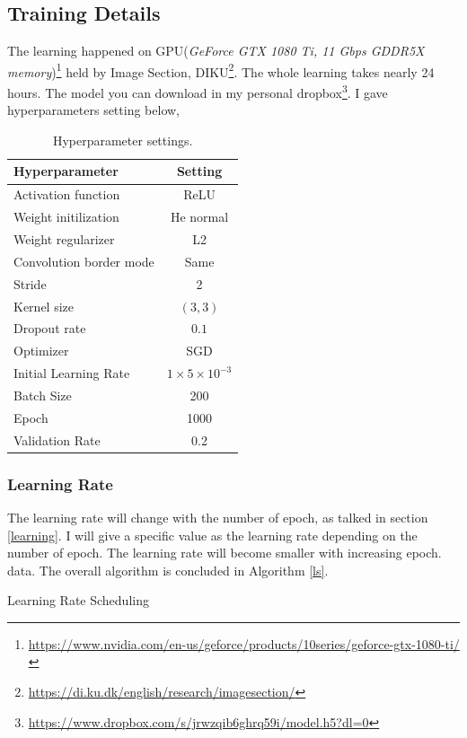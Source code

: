\subsection{Training Details}
    The learning happened on GPU(\textit{GeForce GTX 1080 Ti, 11 Gbps GDDR5X memory})\footnote{\url{https://www.nvidia.com/en-us/geforce/products/10series/geforce-gtx-1080-ti/}} held by Image Section, DIKU\footnote{\url{https://di.ku.dk/english/research/imagesection/}}. The whole learning takes nearly 24 hours. The model you can download in my personal dropbox\footnote{\url{https://www.dropbox.com/s/jrwzqib6ghrq59i/model.h5?dl=0}}. I gave hyperparameters setting below,
    \begin{table}[h!]
        \centering
        \begin{tabular}{ l | c  }
            Hyperparameter  & Setting \\ \hline
            Activation function & ReLU \\
            Weight initilization & He normal\cite{sutskever2013importance} \\
            Weight regularizer &  L2 \cite{hinton2006fast} \\
            Convolution border mode   & Same \\
            Stride & 2 \\ 
            Kernel size & $(3, 3)$ \\
            Dropout rate & $0.1$ \\
            Optimizer & SGD \\
            Initial Learning Rate & $1\times 5\times10^{-3}$ \\
            Batch Size & 200 \\
            Epoch & 1000 \\
            Validation Rate & 0.2 \\
        \end{tabular}
        \caption{Hyperparameter settings.}
        \label{table:hyper}
    \end{table}
    \subsubsection{Learning Rate}
    The learning rate will change with the number of epoch, as talked in section \ref{learning}. I will give a specific value as the learning rate depending on the number of epoch. The learning rate will become smaller with increasing epoch. 
    data. The overall algorithm is concluded in Algorithm \ref{ls}.
    \begin{algorithm}[!h]
        \caption{Learning Rate Scheduling}{}
        \label{ls}
    \end{algorithm}


